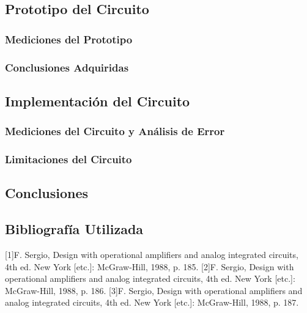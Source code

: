 \documentclass[a4paper]{article}
\begin{document}
\subsection{Prototipo del Circuito}
\subsubsection{Mediciones del Prototipo}
\subsubsection{Conclusiones Adquiridas}

\subsection{Implementación del Circuito}
\subsubsection{Mediciones del Circuito y Análisis de Error}
\subsubsection{Limitaciones del Circuito}

\subsection{Conclusiones}

\subsection{Bibliografía Utilizada}
[1]F. Sergio, Design with operational amplifiers and analog integrated circuits, 4th ed. New York [etc.]: McGraw-Hill, 1988, p. 185.
[2]F. Sergio, Design with operational amplifiers and analog integrated circuits, 4th ed. New York [etc.]: McGraw-Hill, 1988, p. 186.
[3]F. Sergio, Design with operational amplifiers and analog integrated circuits, 4th ed. New York [etc.]: McGraw-Hill, 1988, p. 187.
\end{document}

